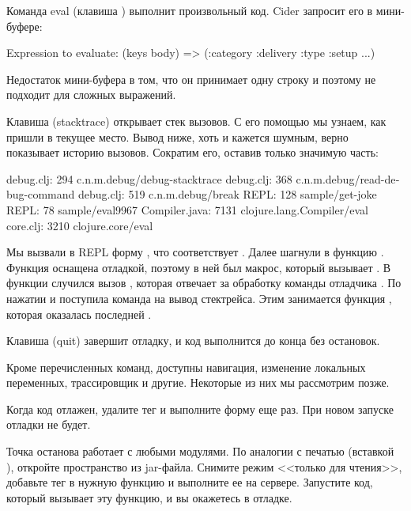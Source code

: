 Команда eval (клавиша ) выполнит произвольный код. Cider запросит его в мини-буфере:

\begin{english}
  \begin{text}
Expression to evaluate: (keys body)
=> (:category :delivery :type :setup ...)
  \end{text}
\end{english}

Недостаток мини-буфера в том, что он принимает одну строку и поэтому не подходит для сложных выражений.

Клавиша  (stacktrace) открывает стек вызовов. С его помощью мы узнаем, как пришли в текущее место. Вывод ниже, хоть и кажется шумным, верно показывает историю вызовов. Сократим его, оставив только значимую часть:

\begin{english}
  \begin{text/lines}
    debug.clj:  294  c.n.m.debug/debug-stacktrace
    debug.clj:  368  c.n.m.debug/read-debug-command
    debug.clj:  519  c.n.m.debug/break
         REPL:  128  sample/get-joke
         REPL:   78  sample/eval9967
Compiler.java: 7131  clojure.lang.Compiler/eval
     core.clj: 3210  clojure.core/eval
  \end{text/lines}
\end{english}

Мы вызвали в REPL форму , что соответствует  . Далее шагнули в функцию  . Функция оснащена отладкой, поэтому в ней был макрос, который вызывает . В функции  случился вызов , которая отвечает за обработку команды отладчика . По нажатии  и поступила команда на вывод стектрейса. Этим занимается функция , которая оказалась последней .

Клавиша  (quit) завершит отладку, и код выполнится до конца без остановок.

Кроме перечисленных команд, доступны навигация, изменение локальных переменных, трассировщик и другие. Некоторые из них мы рассмотрим позже.

Когда код отлажен, удалите тег  и выполните форму еще раз. При новом запуске отладки не будет.

Точка останова работает с любыми модулями. По аналогии с печатью (вставкой ), откройте пространство из jar-файла. Снимите режим <<только для чтения>>, добавьте тег  в нужную функцию и выполните ее на сервере. Запустите код, который вызывает эту функцию, и вы окажетесь в отладке.

